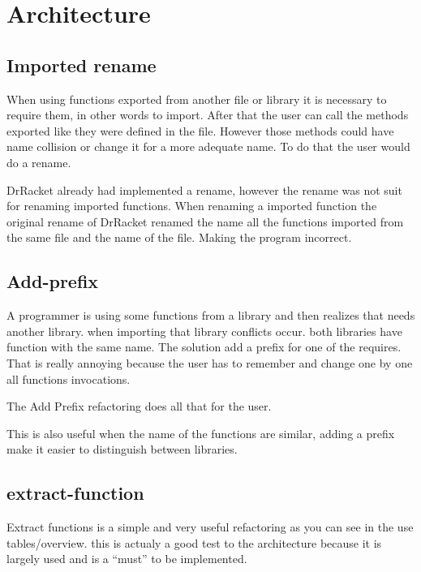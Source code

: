 
% 
% 

\section{Architecture}










\subsection{Imported rename}
When using functions exported from another file or library it is necessary to require them, in other words to import.
After that the user can call the methods exported like they were defined in the file.
However those methods could have name collision or change it for a more adequate name. To do that the user would do a rename.

DrRacket already had implemented a rename, however the rename was not suit for renaming imported functions.
When renaming a imported function the original rename of DrRacket renamed the name all the functions imported from the same file and the name of the file. 
Making the program incorrect.


\subsection{Add-prefix}
A programmer is using some functions from a library and then realizes that needs another library. when importing that library conflicts occur.
both libraries have function with the same name. The solution add a prefix for one of the requires.
That is really annoying because the user has to remember and change one by one all functions invocations.

The Add Prefix refactoring does all that for the user.

This is also useful when the name of the functions are similar, adding a prefix make it easier to distinguish between libraries.


\subsection{extract-function}

Extract functions is a simple and very useful refactoring as you can see in the use tables/overview. this is actualy a good test to the architecture because it is largely used and is a ``must'' to be implemented.
